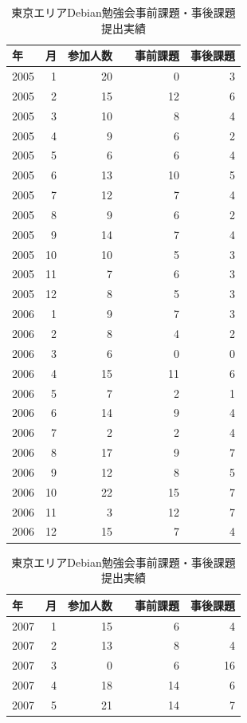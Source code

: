 \documentclass[mingoth,a4paper]{jsarticle}
\begin{document}
\begin{table}[ht]
 \caption{東京エリアDebian勉強会事前課題・事後課題提出実績}\label{tab:attendandprepostwork}
\begin{minipage}{0.5\hsize}
\begin{tabular}{|l|r|r|r|r|}
 \hline
   年&月 & 参加人数 & 事前課題　& 事後課題 \\
 \hline
 2005 & 1 & 20 & 0 & 3 \\
 2005 & 2 & 15 & 12 & 6 \\
 2005 & 3 & 10 & 8 & 4 \\
 2005 & 4 & 9 & 6 & 2 \\
 2005 & 5 & 6 & 6 & 4\\
 2005 & 6 & 13 & 10 & 5\\
 2005 & 7 & 12 & 7 & 4\\
 2005 & 8 & 9 & 6 & 2\\
 2005 & 9 & 14 & 7 & 4\\
 2005 & 10 & 10 & 5 & 3\\
 2005 & 11 & 7 & 6 & 3\\
 2005 & 12 & 8 & 5 & 3\\
 2006 & 1 & 9 & 7 & 3\\
 2006 & 2 & 8 & 4 & 2\\
 2006 & 3 & 6 & 0 & 0\\
 2006 & 4 & 15 & 11 & 6\\
 2006 & 5 & 7 & 2 & 1\\
 2006 & 6 & 14 & 9 & 4\\
 2006 & 7 & 2 & 2 & 4\\
 2006 & 8 & 17 & 9 & 7\\
 2006 & 9 & 12 & 8 & 5\\
 2006 & 10 & 22 & 15 & 7\\
 2006 & 11 & 3 & 12 & 7\\
 2006 & 12 & 15 & 7 & 4\\
\end{tabular}
\end{minipage}
\begin{minipage}{0.5\hsize}
\begin{tabular}{|l|r|r|r|r|}
 \hline
   年&月 & 参加人数 & 事前課題　& 事後課題 \\
 \hline
 2007 & 1 & 15 & 6 & 4\\
 2007 & 2 & 13 & 8 & 4\\
 2007 & 3 & 0 & 6 & 16\\
 2007 & 4 & 18 & 14 & 6\\
 2007 & 5 & 21 & 14 & 7\\

\end{tabular}
\end{minipage}
\end{table}
\end{document}
